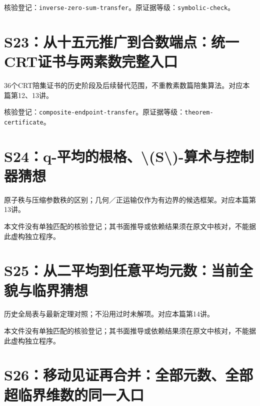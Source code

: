 核验登记：{\small\nolinkurl{inverse-zero-sum-transfer}}。原证据等级：{\small\nolinkurl{symbolic-check}}。

\section{S23：从十五元推广到合数端点：统一CRT证书与两素数完整入口}\label{source:S23}

36个CRT陪集证书的历史阶段及后续替代范围，不重教素数篇陪集算法。对应本篇第12、13讲。

\par{}\par

核验登记：{\small\nolinkurl{composite-endpoint-transfer}}。原证据等级：{\small\nolinkurl{theorem-certificate}}。

\section{S24：q-平均的根格、\textbackslash{}(S\textbackslash{})-算术与控制器猜想}\label{source:S24}

原子秩与压缩参数秩的区别；几何／正运输仅作为有边界的候选框架。对应本篇第13讲。

\par{}\par

本文件没有单独匹配的核验登记；其书面推导或依赖结果须在原文中核对，不能据此虚构独立程序。

\section{S25：从二平均到任意平均元数：当前全貌与临界猜想}\label{source:S25}

历史全局表与最新定理对照；不沿用过时未解项。对应本篇第14讲。

\par{}\par

本文件没有单独匹配的核验登记；其书面推导或依赖结果须在原文中核对，不能据此虚构独立程序。

\section{S26：移动见证再合并：全部元数、全部超临界维数的同一入口}\label{source:S26}

